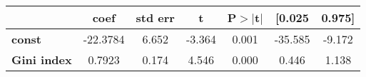 \begin{center}
\begin{tabular}{lcccccc}
\toprule
                    & \textbf{coef} & \textbf{std err} & \textbf{t} & \textbf{P$> |$t$|$} & \textbf{[0.025} & \textbf{0.975]}  \\
\midrule
\textbf{const}      &     -22.3784  &        6.652     &    -3.364  &         0.001        &      -35.585    &       -9.172     \\
\textbf{Gini index} &       0.7923  &        0.174     &     4.546  &         0.000        &        0.446    &        1.138     \\
\bottomrule
\end{tabular}
\end{center}
